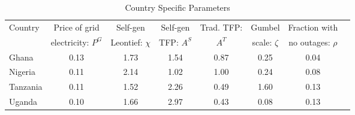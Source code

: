 \begin{table}[H] 
\center 
\singlespace 
\caption{Country Specific Parameters} \label{country_params}
\vspace{-.1in} 
\begin{tabular}{l c c c c c c c}\hline 
\hline 
 \multirow{2}{*}{Country} & Price of grid  & Self-gen  &Self-gen   & Trad. TFP: & Gumbel  & Fraction with  \\ [-.5ex] 
  & electricity: $P^G$ & Leontief: $\chi$  & TFP: $A^S$ & $A^T$ & scale: $\zeta$ & no outages: $\rho$ \\ [.5ex] 
\hline 
Ghana  &     0.13 &     1.73 &     1.54  &     0.87   &     0.25  &     0.04  \\  Nigeria  &     0.11 &     2.14 &     1.02  &     1.00  &     0.24  &     0.08   \\  Tanzania  &     0.11 &     1.52 &     2.26  &     0.49  &     1.60  &     0.13  \\  Uganda  &     0.10 &     1.66 &     2.97  &     0.43  &     0.08   &     0.13  \\  \hline 
\end{tabular}
\end{table} 
